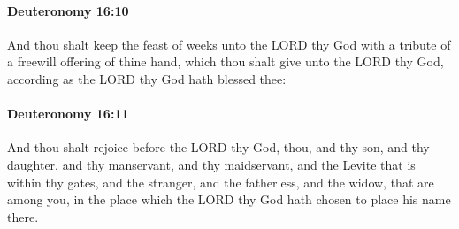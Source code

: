 		\paragraph{Deuteronomy 16:10} %
			\label{DEUTERONOMY-16-10}

			And thou shalt keep the feast of weeks unto the LORD thy God with a tribute of a freewill offering of thine hand, which thou shalt give unto the LORD thy God, according as the LORD thy God hath blessed thee:


		\paragraph{Deuteronomy 16:11} %
			\label{DEUTERONOMY-16-11}

			And thou shalt rejoice before the LORD thy God, thou, and thy son, and thy daughter, and thy manservant, and thy maidservant, and the Levite that is within thy gates, and the stranger, and the fatherless, and the widow, that are among you, in the place which the LORD thy God hath chosen to place his name there.

